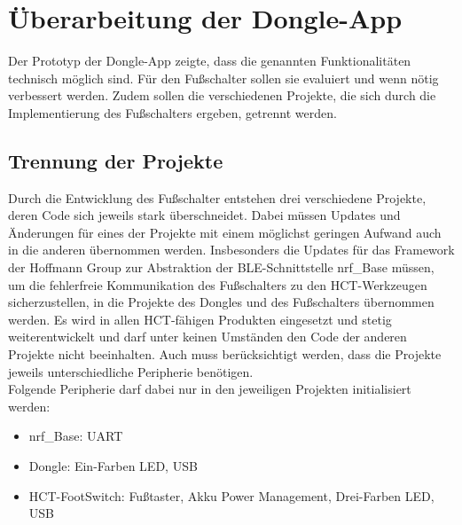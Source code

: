 \section{Überarbeitung der Dongle-App}
Der Prototyp der Dongle-App zeigte, dass die genannten Funktionalitäten technisch möglich sind. Für den Fußschalter sollen sie evaluiert und wenn nötig verbessert werden. Zudem sollen die verschiedenen Projekte, die sich durch die Implementierung des Fußschalters ergeben, getrennt werden.

\subsection{Trennung der Projekte}
Durch die Entwicklung des Fußschalter entstehen drei verschiedene Projekte, deren Code sich jeweils stark überschneidet. Dabei müssen Updates und Änderungen für eines der Projekte mit einem möglichst geringen Aufwand auch in die anderen übernommen werden. Insbesonders die Updates für das Framework der Hoffmann Group zur Abstraktion der \ac{BLE}-Schnittstelle nrf\_Base müssen, um die fehlerfreie Kommunikation des Fußschalters zu den \ac{HCT}-Werkzeugen sicherzustellen, in die Projekte des Dongles und des Fußschalters übernommen werden. Es wird in allen \ac{HCT}-fähigen Produkten eingesetzt und stetig weiterentwickelt und darf unter keinen Umständen den Code der anderen Projekte nicht beeinhalten. Auch muss berücksichtigt werden, dass die Projekte jeweils unterschiedliche Peripherie benötigen.\\
Folgende Peripherie darf dabei nur in den jeweiligen Projekten initialisiert werden:
\begin{itemize}
	\item nrf\_Base: \ac{UART}
	\item Dongle: Ein-Farben LED, \ac{USB}
	\item \ac{HCT}-FootSwitch: Fußtaster, Akku Power Management, Drei-Farben LED, \ac{USB}
\end{itemize}

